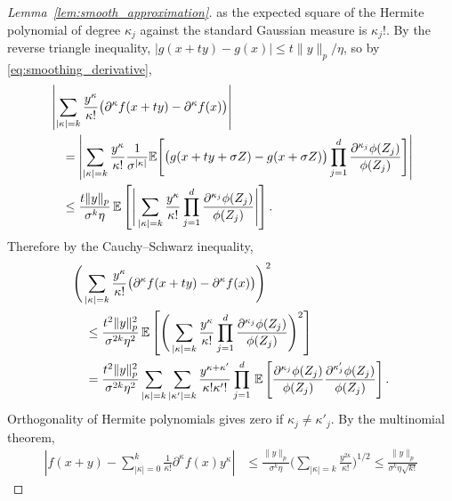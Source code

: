\begin{proof}[Lemma~\ref{lem:smooth_approximation}]
  as the expected square of the Hermite polynomial of degree
  $\kappa_j$ against the standard Gaussian measure is $\kappa_j!$. By the
  reverse triangle inequality, $|g(x + t y) - g(x)| \leq t \|y\|_p / \eta$,
  so by \eqref{eq:smoothing_derivative},
  \begin{align*}
    &\left|
    \sum_{|\kappa|=k}
    \frac{y^\kappa}{\kappa!}
    \big(
      \partial^{\kappa} f(x + t y)
      - \partial^{\kappa} f(x)
    \big)
    \right| \\
    &\quad=
    \left|
    \sum_{|\kappa|=k}
    \frac{y^\kappa}{\kappa!}
    \frac{1}{\sigma^{|\kappa|}}
    \mathbb{E} \Bigg[
      \big(
        g(x + t y + \sigma Z)
        - g(x + \sigma Z)
      \big)
      \prod_{j=1}^{d}
      \frac{\partial^{\kappa_j}\phi(Z_j)}{\phi(Z_j)}
    \Bigg]
    \right| \\
    &\quad\leq
    \frac{t \|y\|_p}{\sigma^k \eta}
    \, \mathbb{E} \left[
      \Bigg|
      \sum_{|\kappa|=k}
      \frac{y^\kappa}{\kappa!}
      \prod_{j=1}^{d}
      \frac{\partial^{\kappa_j}\phi(Z_j)}{\phi(Z_j)}
      \Bigg|
    \right].
  \end{align*}
  Therefore by the Cauchy--Schwarz inequality,
  \begin{align*}
    &\Bigg(
      \sum_{|\kappa|=k}
      \frac{y^\kappa}{\kappa!}
      \big(
        \partial^{\kappa} f(x + t y)
        - \partial^{\kappa} f(x)
      \big)
    \Bigg)^2 \\
    &\quad\leq
    \frac{t^2 \|y\|_p^2}{\sigma^{2k} \eta^2}
    \, \mathbb{E} \left[
      \Bigg(
        \sum_{|\kappa|=k}
        \frac{y^\kappa}{\kappa!}
        \prod_{j=1}^{d}
        \frac{\partial^{\kappa_j} \phi(Z_j)}{\phi(Z_j)}
      \Bigg)^2
    \right] \\
    &\quad=
    \frac{t^2 \|y\|_p^2}{\sigma^{2k} \eta^2}
    \sum_{|\kappa|=k}
    \sum_{|\kappa'|=k}
    \frac{y^{\kappa + \kappa'}}{\kappa! \kappa'!}
    \prod_{j=1}^{d}
    \, \mathbb{E} \left[
      \frac{\partial^{\kappa_j} \phi(Z_j)}{\phi(Z_j)}
      \frac{\partial^{\kappa'_j} \phi(Z_j)}{\phi(Z_j)}
    \right].
  \end{align*}
  Orthogonality of Hermite polynomials gives zero if
  $\kappa_j \neq \kappa'_j$. By the multinomial theorem,
  \begin{align*}
    \left|
    f(x + y)
    - \sum_{|\kappa|=0}^{k}
    \frac{1}{\kappa!}
    \partial^{\kappa} f(x)
    y^\kappa
    \right|
    &\leq
    \frac{\|y\|_p}{\sigma^k \eta}
    \Bigg(
      \sum_{|\kappa|=k}
      \frac{y^{2 \kappa}}{\kappa!}
    \Bigg)^{1/2}
    \leq
    \frac{\|y\|_p}{\sigma^k \eta \sqrt{k!}}

\end{align*}
\end{proof}
